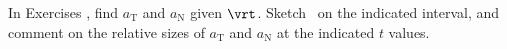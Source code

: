 {\noindent In Exercises}
{ , find $a_{\text{T}}$ and $a_{\text{N}}$ given $\vrt$. Sketch \vrt\ on the indicated interval, and comment on the relative sizes of $a_{\text{T}}$ and $a_{\text{N}}$ at the indicated $t$ values.
}
